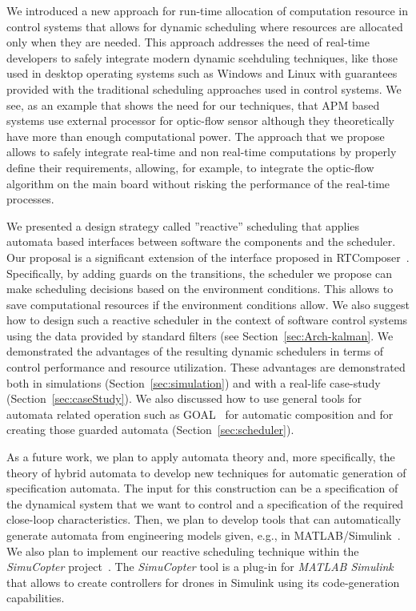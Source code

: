 \documentclass[ twoside, 12pt ]{article}
\begin{document}
We introduced a new approach for run-time allocation of computation resource in control systems that allows for dynamic scheduling where resources are allocated only when they are needed. 
This approach addresses the need of real-time developers to safely integrate modern dynamic scehduling techniques, like those used in desktop operating systems such as Windows and Linux
with guarantees provided with the traditional scheduling approaches used in control systems. We see, as an example that shows the need for our techniques, that APM based systems use external processor for optic-flow sensor although they theoretically have more than enough computational power.  The approach that we propose allows to safely integrate real-time and non real-time computations by properly define their requirements, allowing, for example, to integrate the optic-flow algorithm on the main board without risking the performance of the real-time processes.

We presented a design strategy called ''reactive'' scheduling that applies automata based interfaces between software the components and the scheduler. Our proposal is a significant extension of the interface proposed in RTComposer~\cite{RTComposer}. Specifically,  by adding guards on the transitions, the scheduler we propose can make scheduling decisions based on the environment conditions. This allows to save computational resources if the environment conditions allow.
We also suggest how to design such a reactive scheduler in the context of software control systems using the data provided by standard filters (see Section~\ref{sec:Arch-kalman}.
We demonstrated the advantages of the resulting dynamic schedulers in terms of control performance and resource utilization. These advantages are demonstrated both in simulations (Section~\ref{sec:simulation}) and with a real-life case-study (Section~\ref{sec:caseStudy}).
We also discussed how to use general tools for automata related operation such as GOAL~\cite{goal} for automatic composition and for creating those guarded automata (Section~\ref{sec:scheduler}).

As a future work, we plan to apply automata theory and, more specifically, the theory of hybrid automata to develop new techniques for automatic generation of specification automata. The input for this construction can be a specification of the dynamical system that we want to control and a specification of the required close-loop characteristics. Then, we plan to develop tools that can automatically generate automata from engineering models given, e.g., in MATLAB/Simulink~\cite{matlab}.
We also plan to implement our reactive scheduling technique within the \textit{SimuCopter} project~\cite{SimuCopter}. The \textit{SimuCopter} tool is a plug-in for \textit{MATLAB Simulink}~\cite{Simulink} that allows to create controllers for drones in Simulink using its code-generation capabilities. 
\end{document}
